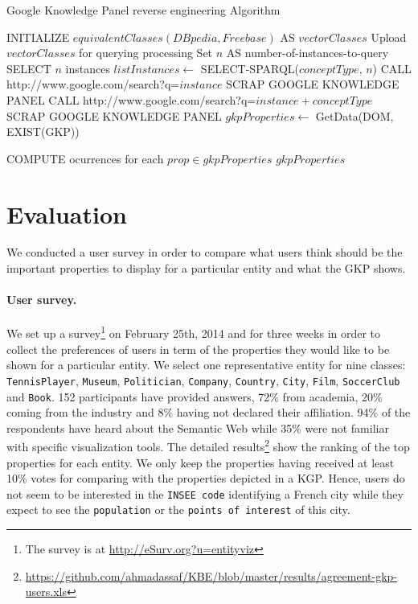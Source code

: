 \documentclass[runningheads,a4paper]{llncs}
\begin{document}
\begin{algorithm}[h]\scriptsize
\caption{Google Knowledge Panel reverse engineering Algorithm} \label{algoscrapping}
\begin{algorithmic}[1]
    \STATE INITIALIZE $equivalentClasses(DBpedia,Freebase) $ AS $vectorClasses$
    \STATE Upload $vectorClasses$ for querying processing
    \STATE Set $n$ AS number-of-instances-to-query
	\STATE SELECT $n$ instances
	\STATE $listInstances \leftarrow$ SELECT-SPARQL($conceptType$, $n$)
			\STATE CALL http://www.google.com/search?q=$instance$
				\STATE SCRAP GOOGLE KNOWLEDGE PANEL
			\ELSE
				\STATE CALL http://www.google.com/search?q=$instance + conceptType$
 				\STATE SCRAP GOOGLE KNOWLEDGE PANEL
			\ENDIF
			\STATE $gkpProperties \leftarrow$ GetData(DOM, EXIST(GKP))
			
		\ENDFOR
	\STATE COMPUTE ocurrences for each $prop \in gkpProperties$
    \ENDFOR
    \RETURN $gkpProperties$
\end{algorithmic}
\end{algorithm}
\normalsize



\section{Evaluation}
\label{sec:evaluation}
We conducted a user survey in order to compare what users think should be the important properties to display for a particular entity and what the GKP shows.

\paragraph{\textbf{User survey.}}
\label{sec:survey}
We set up a survey\footnote{The survey is at \url{http://eSurv.org?u=entityviz}} on February 25th, 2014 and for three weeks in order to collect the preferences of users in term of the properties they would like to be shown for a particular entity. We select one representative entity for nine classes: \texttt{TennisPlayer}, \texttt{Museum}, \texttt{Politician}, \texttt{Company}, \texttt{Country}, \texttt{City}, \texttt{Film}, \texttt{SoccerClub} and \texttt{Book}. 152 participants have provided answers, 72\% from academia, 20\% coming from the industry and 8\% having not declared their affiliation. 94\% of the respondents have heard about the Semantic Web while 35\% were not familiar with specific visualization tools. The detailed results\footnote{\url{https://github.com/ahmadassaf/KBE/blob/master/results/agreement-gkp-users.xls}} show the ranking of the top properties for each entity. We only keep the properties having received at least 10\% votes for comparing with the properties depicted in a KGP. Hence, users do not seem to be interested in the \texttt{INSEE code} identifying a French city while they expect to see the \texttt{population} or the \texttt{points of interest} of this city.
\end{document}
